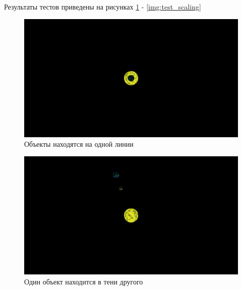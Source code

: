 Результаты тестов приведены на рисунках \ref{img:test_one_line} - \ref{img:test_scaling}
\begin{center}
	\begin{figure}[H]
		\centering
		\includegraphics[scale=0.3]{inc/img/one_line.png}
		\caption{Объекты находятся на одной линии}
		\label{img:test_one_line}
	\end{figure}
\end{center}

\begin{center}
	\begin{figure}[H]
		\centering
		\includegraphics[scale=0.3]{inc/img/shadow.png}
		\caption{Один объект находится в тени другого}
		\label{img:test_shadow}
	\end{figure}
\end{center}

